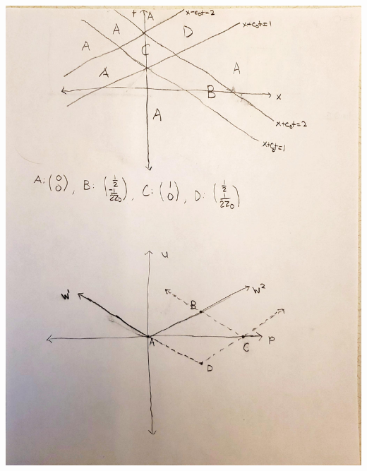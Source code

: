 \documentclass{article}
\begin{document}
\includegraphics[scale=0.45]{574figs1v2.pdf}
\end{document}
